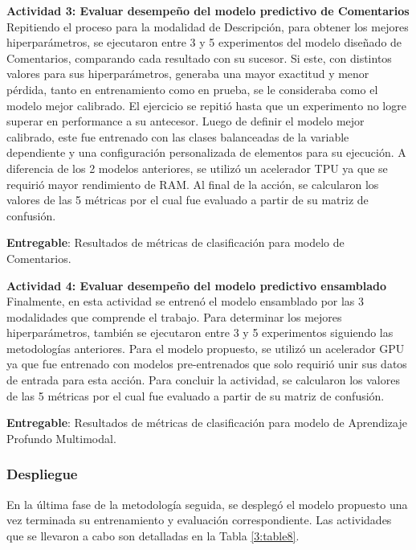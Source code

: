 \textbf{Actividad 3: Evaluar desempeño del modelo predictivo de Comentarios}
\\
Repitiendo el proceso para la modalidad de Descripción, para obtener los mejores hiperparámetros, se ejecutaron entre 3 y 5 experimentos del modelo diseñado de Comentarios, comparando cada resultado con su sucesor. Si este, con distintos valores para sus hiperparámetros, generaba una mayor exactitud y menor pérdida, tanto en entrenamiento como en prueba, se le consideraba como el modelo mejor calibrado. El ejercicio se repitió hasta que un experimento no logre superar en performance a su antecesor. Luego de definir el modelo mejor calibrado, este fue entrenado con las clases balanceadas de la variable dependiente y una configuración personalizada de elementos para su ejecución. A diferencia de los 2 modelos anteriores, se utilizó un acelerador TPU ya que se requirió mayor rendimiento de RAM. Al final de la acción, se calcularon los valores de las 5 métricas por el cual fue evaluado a partir de su matriz de confusión.

\textbf{Entregable}: Resultados de métricas de clasificación para modelo de Comentarios.

\textbf{Actividad 4: Evaluar desempeño del modelo predictivo ensamblado}
\\
Finalmente, en esta actividad se entrenó el modelo ensamblado por las 3 modalidades que comprende el trabajo. Para determinar los mejores hiperparámetros, también se ejecutaron entre 3 y 5 experimentos siguiendo las metodologías anteriores. Para el modelo propuesto, se utilizó un acelerador GPU ya que fue entrenado con modelos pre-entrenados que solo requirió unir sus datos de entrada para esta acción. Para concluir la actividad, se calcularon los valores de las 5 métricas por el cual fue evaluado a partir de su matriz de confusión.

\textbf{Entregable}: Resultados de métricas de clasificación para modelo de Aprendizaje Profundo Multimodal.

\subsubsection{Despliegue}
En la última fase de la metodología seguida, se desplegó el modelo propuesto una vez terminada su entrenamiento y evaluación correspondiente. Las actividades que se llevaron a cabo son detalladas en la Tabla \ref{3:table8}.

